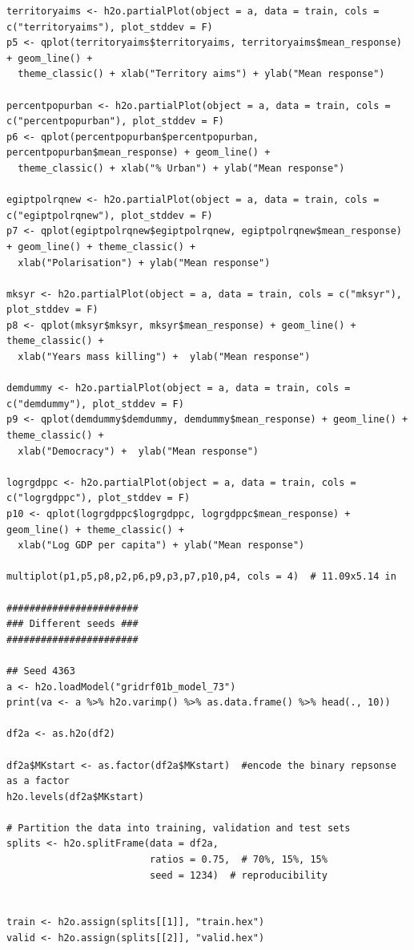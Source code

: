 \begin{verbatim}
territoryaims <- h2o.partialPlot(object = a, data = train, cols = c("territoryaims"), plot_stddev = F)
p5 <- qplot(territoryaims$territoryaims, territoryaims$mean_response) + geom_line() +
  theme_classic() + xlab("Territory aims") + ylab("Mean response")

percentpopurban <- h2o.partialPlot(object = a, data = train, cols = c("percentpopurban"), plot_stddev = F)
p6 <- qplot(percentpopurban$percentpopurban, percentpopurban$mean_response) + geom_line() +
  theme_classic() + xlab("% Urban") + ylab("Mean response")

egiptpolrqnew <- h2o.partialPlot(object = a, data = train, cols = c("egiptpolrqnew"), plot_stddev = F)
p7 <- qplot(egiptpolrqnew$egiptpolrqnew, egiptpolrqnew$mean_response) + geom_line() + theme_classic() +
  xlab("Polarisation") + ylab("Mean response")

mksyr <- h2o.partialPlot(object = a, data = train, cols = c("mksyr"), plot_stddev = F)
p8 <- qplot(mksyr$mksyr, mksyr$mean_response) + geom_line() + theme_classic() + 
  xlab("Years mass killing") +  ylab("Mean response")

demdummy <- h2o.partialPlot(object = a, data = train, cols = c("demdummy"), plot_stddev = F)
p9 <- qplot(demdummy$demdummy, demdummy$mean_response) + geom_line() + theme_classic() + 
  xlab("Democracy") +  ylab("Mean response")

logrgdppc <- h2o.partialPlot(object = a, data = train, cols = c("logrgdppc"), plot_stddev = F)
p10 <- qplot(logrgdppc$logrgdppc, logrgdppc$mean_response) + geom_line() + theme_classic() +
  xlab("Log GDP per capita") + ylab("Mean response")

multiplot(p1,p5,p8,p2,p6,p9,p3,p7,p10,p4, cols = 4)  # 11.09x5.14 in

#######################
### Different seeds ###
#######################

## Seed 4363
a <- h2o.loadModel("gridrf01b_model_73")
print(va <- a %>% h2o.varimp() %>% as.data.frame() %>% head(., 10))

df2a <- as.h2o(df2)

df2a$MKstart <- as.factor(df2a$MKstart)  #encode the binary repsonse as a factor
h2o.levels(df2a$MKstart)

# Partition the data into training, validation and test sets
splits <- h2o.splitFrame(data = df2a, 
                         ratios = 0.75,  # 70%, 15%, 15%
                         seed = 1234)  # reproducibility


train <- h2o.assign(splits[[1]], "train.hex")   
valid <- h2o.assign(splits[[2]], "valid.hex") 


\end{verbatim}
